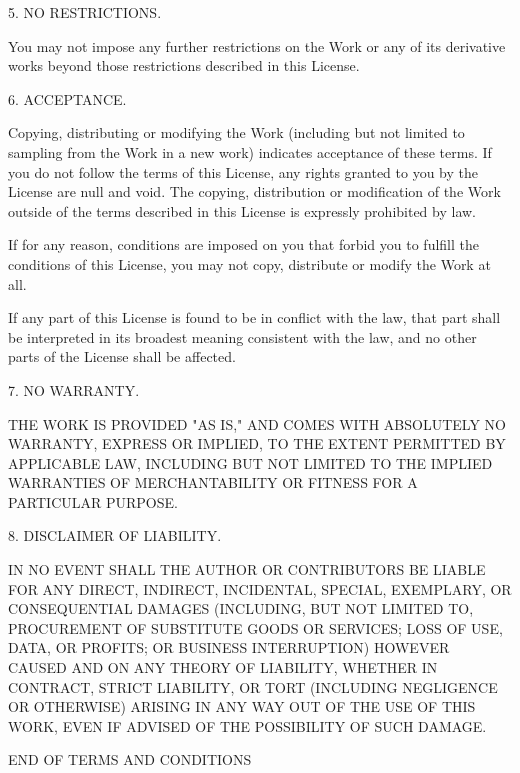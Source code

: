 \documentclass[
  english,
  11pt,
  a4paper,
]{article}
\begin{document}
5. NO RESTRICTIONS.

You may not impose any further restrictions on the Work or any of its
derivative works beyond those restrictions described in this License.

6. ACCEPTANCE.

Copying, distributing or modifying the Work (including but not limited
to sampling from the Work in a new work) indicates acceptance of these
terms. If you do not follow the terms of this License, any rights
granted to you by the License are null and void. The copying,
distribution or modification of the Work outside of the terms described
in this License is expressly prohibited by law.

If for any reason, conditions are imposed on you that forbid you to
fulfill the conditions of this License, you may not copy, distribute or
modify the Work at all.

If any part of this License is found to be in conflict with the law,
that part shall be interpreted in its broadest meaning consistent with
the law, and no other parts of the License shall be affected.

7. NO WARRANTY.

THE WORK IS PROVIDED "AS IS," AND COMES WITH ABSOLUTELY NO WARRANTY,
EXPRESS OR IMPLIED, TO THE EXTENT PERMITTED BY APPLICABLE LAW, INCLUDING
BUT NOT LIMITED TO THE IMPLIED WARRANTIES OF MERCHANTABILITY OR FITNESS
FOR A PARTICULAR PURPOSE.

8. DISCLAIMER OF LIABILITY.

IN NO EVENT SHALL THE AUTHOR OR CONTRIBUTORS BE LIABLE FOR ANY DIRECT,
INDIRECT, INCIDENTAL, SPECIAL, EXEMPLARY, OR CONSEQUENTIAL DAMAGES
(INCLUDING, BUT NOT LIMITED TO, PROCUREMENT OF SUBSTITUTE GOODS OR
SERVICES; LOSS OF USE, DATA, OR PROFITS; OR BUSINESS INTERRUPTION)
HOWEVER CAUSED AND ON ANY THEORY OF LIABILITY, WHETHER IN CONTRACT,
STRICT LIABILITY, OR TORT (INCLUDING NEGLIGENCE OR OTHERWISE) ARISING IN
ANY WAY OUT OF THE USE OF THIS WORK, EVEN IF ADVISED OF THE POSSIBILITY
OF SUCH DAMAGE.

END OF TERMS AND CONDITIONS
\end{document}
